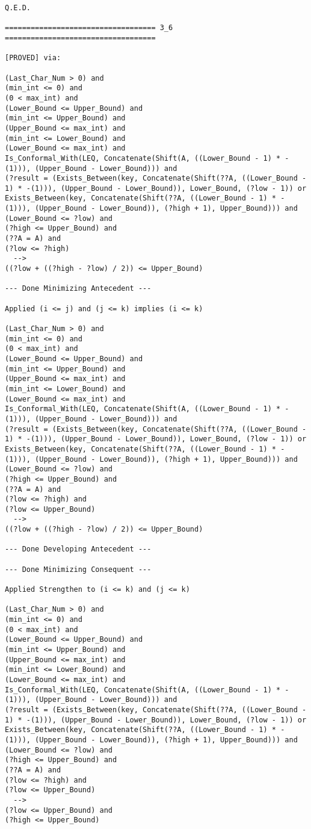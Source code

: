 \begin{lstlisting}[language=resolve]
Q.E.D.

=================================== 3_6 ===================================

[PROVED] via:

(Last_Char_Num > 0) and
(min_int <= 0) and
(0 < max_int) and
(Lower_Bound <= Upper_Bound) and
(min_int <= Upper_Bound) and
(Upper_Bound <= max_int) and
(min_int <= Lower_Bound) and
(Lower_Bound <= max_int) and
Is_Conformal_With(LEQ, Concatenate(Shift(A, ((Lower_Bound - 1) * -(1))), (Upper_Bound - Lower_Bound))) and
(?result = (Exists_Between(key, Concatenate(Shift(??A, ((Lower_Bound - 1) * -(1))), (Upper_Bound - Lower_Bound)), Lower_Bound, (?low - 1)) or Exists_Between(key, Concatenate(Shift(??A, ((Lower_Bound - 1) * -(1))), (Upper_Bound - Lower_Bound)), (?high + 1), Upper_Bound))) and
(Lower_Bound <= ?low) and
(?high <= Upper_Bound) and
(??A = A) and
(?low <= ?high)
  -->
((?low + ((?high - ?low) / 2)) <= Upper_Bound)

--- Done Minimizing Antecedent ---

Applied (i <= j) and (j <= k) implies (i <= k)

(Last_Char_Num > 0) and
(min_int <= 0) and
(0 < max_int) and
(Lower_Bound <= Upper_Bound) and
(min_int <= Upper_Bound) and
(Upper_Bound <= max_int) and
(min_int <= Lower_Bound) and
(Lower_Bound <= max_int) and
Is_Conformal_With(LEQ, Concatenate(Shift(A, ((Lower_Bound - 1) * -(1))), (Upper_Bound - Lower_Bound))) and
(?result = (Exists_Between(key, Concatenate(Shift(??A, ((Lower_Bound - 1) * -(1))), (Upper_Bound - Lower_Bound)), Lower_Bound, (?low - 1)) or Exists_Between(key, Concatenate(Shift(??A, ((Lower_Bound - 1) * -(1))), (Upper_Bound - Lower_Bound)), (?high + 1), Upper_Bound))) and
(Lower_Bound <= ?low) and
(?high <= Upper_Bound) and
(??A = A) and
(?low <= ?high) and
(?low <= Upper_Bound)
  -->
((?low + ((?high - ?low) / 2)) <= Upper_Bound)

--- Done Developing Antecedent ---

--- Done Minimizing Consequent ---

Applied Strengthen to (i <= k) and (j <= k)

(Last_Char_Num > 0) and
(min_int <= 0) and
(0 < max_int) and
(Lower_Bound <= Upper_Bound) and
(min_int <= Upper_Bound) and
(Upper_Bound <= max_int) and
(min_int <= Lower_Bound) and
(Lower_Bound <= max_int) and
Is_Conformal_With(LEQ, Concatenate(Shift(A, ((Lower_Bound - 1) * -(1))), (Upper_Bound - Lower_Bound))) and
(?result = (Exists_Between(key, Concatenate(Shift(??A, ((Lower_Bound - 1) * -(1))), (Upper_Bound - Lower_Bound)), Lower_Bound, (?low - 1)) or Exists_Between(key, Concatenate(Shift(??A, ((Lower_Bound - 1) * -(1))), (Upper_Bound - Lower_Bound)), (?high + 1), Upper_Bound))) and
(Lower_Bound <= ?low) and
(?high <= Upper_Bound) and
(??A = A) and
(?low <= ?high) and
(?low <= Upper_Bound)
  -->
(?low <= Upper_Bound) and
(?high <= Upper_Bound)


\end{lstlisting}

